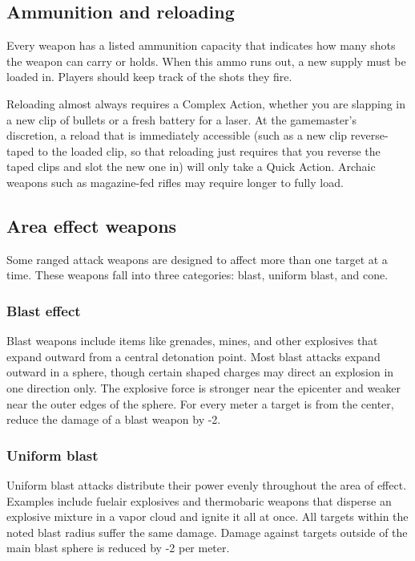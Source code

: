\subsection{Ammunition and reloading}
\label{sec:ammunition-reloading}

Every weapon has a listed ammunition capacity that indicates how many shots the weapon can carry or holds. When this ammo runs out, a new supply must be loaded in. Players should keep track of the shots they fire.

Reloading almost always requires a Complex Action, whether you are slapping in a new clip of bullets or a fresh battery for a laser. At the gamemaster’s discretion, a reload that is immediately accessible (such as a new clip reverse-taped to the loaded clip, so that reloading just requires that you reverse the taped clips and slot the new one in) will only take a Quick Action. Archaic weapons such as magazine-fed rifles may require longer to fully load.


\subsection{Area effect weapons}
\label{sec:area-effect-weapons}

Some ranged attack weapons are designed to affect more than one target at a time. These weapons fall into three categories: blast, uniform blast, and cone.

\subsubsection{Blast effect}

Blast weapons include items like grenades, mines, and other explosives that expand outward from a central detonation point. Most blast attacks expand outward in a sphere, though certain shaped charges may direct an explosion in one direction only. The explosive force is stronger near the epicenter and weaker near the outer edges of the sphere. For every meter a target is from the center, reduce the damage of a blast weapon by -2.

\subsubsection{Uniform blast}

Uniform blast attacks distribute their power evenly throughout the area of effect. Examples include fuelair explosives and thermobaric weapons that disperse an explosive mixture in a vapor cloud and ignite it all at once. All targets within the noted blast radius suffer the same damage. Damage against targets outside of the main blast sphere is reduced by -2 per meter.

